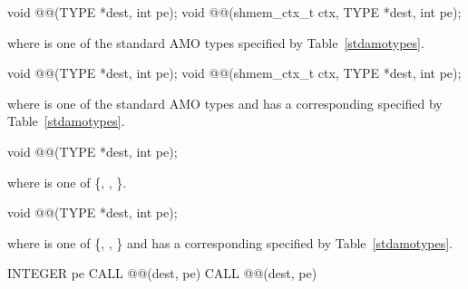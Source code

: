
\begin{apidefinition}

\begin{C11synopsis}
void @@(TYPE *dest, int pe);
void @@(shmem_ctx_t ctx, TYPE *dest, int pe);
\end{C11synopsis}
where \TYPE{} is one of the standard \ac{AMO} types specified by
Table~\ref{stdamotypes}.

\begin{Csynopsis}
void @@(TYPE *dest, int pe);
void @@(shmem_ctx_t ctx, TYPE *dest, int pe);
\end{Csynopsis}
where \TYPE{} is one of the standard \ac{AMO} types and has a corresponding
\TYPENAME{} specified by Table~\ref{stdamotypes}.

\begin{DeprecateBlock}
\begin{C11synopsis}
void @@(TYPE *dest, int pe);
\end{C11synopsis}
where \TYPE{} is one of \{, , \}.

\begin{Csynopsis}
void @@(TYPE *dest, int pe);
\end{Csynopsis}
where \TYPE{} is one of \{, , \}
and has a corresponding \TYPENAME{} specified by Table~\ref{stdamotypes}.
\end{DeprecateBlock}

\begin{Fsynopsis}
INTEGER pe
CALL @@(dest, pe)
CALL @@(dest, pe)
\end{Fsynopsis}

\begin{apiarguments}



\end{apiarguments}
\end{apidefinition}
